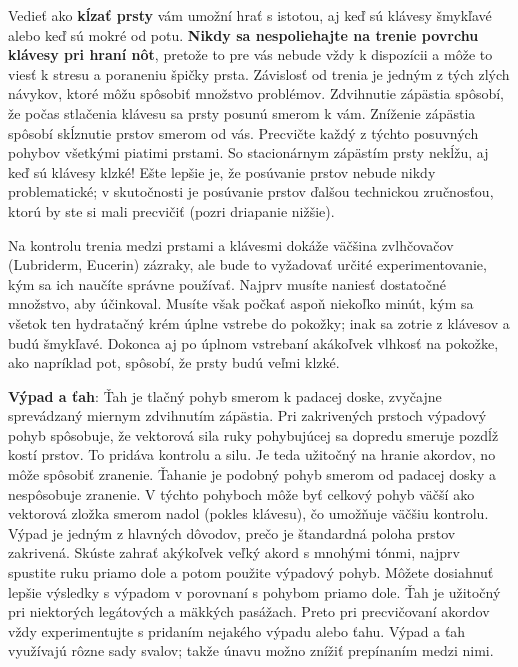 \documentclass[11pt,a4paper]{book}
\begin{document}
Vedieť ako \textbf{kĺzať prsty} vám umožní hrať s istotou, aj keď sú klávesy šmykľavé alebo keď sú mokré od potu. \textbf{Nikdy sa nespoliehajte na trenie povrchu klávesy pri hraní nôt}, pretože to pre vás nebude vždy k dispozícii a môže to viesť k stresu a poraneniu špičky prsta. Závislosť od trenia je jedným z tých zlých návykov, ktoré môžu spôsobiť množstvo problémov. Zdvihnutie zápästia spôsobí, že počas stlačenia klávesu sa prsty posunú smerom k vám. Zníženie zápästia spôsobí skĺznutie prstov smerom od vás. Precvičte každý z týchto posuvných pohybov všetkými piatimi prstami. So stacionárnym zápästím prsty nekĺžu, aj keď sú klávesy klzké! Ešte lepšie je, že posúvanie prstov nebude nikdy problematické; v skutočnosti je posúvanie prstov ďalšou technickou zručnosťou, ktorú by ste si mali precvičiť (pozri driapanie nižšie).

Na kontrolu trenia medzi prstami a klávesmi dokáže väčšina zvlhčovačov (Lubriderm, Eucerin) zázraky, ale bude to vyžadovať určité experimentovanie, kým sa ich naučíte správne používať. Najprv musíte naniesť dostatočné množstvo, aby účinkoval. Musíte však počkať aspoň niekoľko minút, kým sa všetok ten hydratačný krém úplne vstrebe do pokožky; inak sa zotrie z klávesov a budú šmykľavé. Dokonca aj po úplnom vstrebaní akákoľvek vlhkosť na pokožke, ako napríklad pot, spôsobí, že prsty budú veľmi klzké.

\textbf{Výpad a ťah}: Ťah je tlačný pohyb smerom k padacej doske, zvyčajne sprevádzaný miernym zdvihnutím zápästia. Pri zakrivených prstoch výpadový pohyb spôsobuje, že vektorová sila ruky pohybujúcej sa dopredu smeruje pozdĺž kostí prstov. To pridáva kontrolu a silu. Je teda užitočný na hranie akordov, no môže spôsobiť zranenie. Ťahanie je podobný pohyb smerom od padacej dosky a nespôsobuje zranenie. V týchto pohyboch môže byť celkový pohyb väčší ako vektorová zložka smerom nadol (pokles klávesu), čo umožňuje väčšiu kontrolu. Výpad je jedným z hlavných dôvodov, prečo je štandardná poloha prstov zakrivená. Skúste zahrať akýkoľvek veľký akord s mnohými tónmi, najprv spustite ruku priamo dole a potom použite výpadový pohyb. Môžete dosiahnuť lepšie výsledky s výpadom v porovnaní s pohybom priamo dole. Ťah je užitočný pri niektorých legátových a mäkkých pasážach. Preto pri precvičovaní akordov vždy experimentujte s pridaním nejakého výpadu alebo ťahu. Výpad a ťah využívajú rôzne sady svalov; takže únavu možno znížiť prepínaním medzi nimi.
\end{document}
